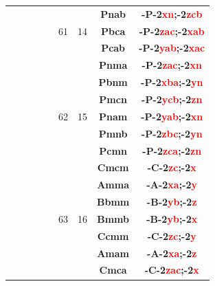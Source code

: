 \documentclass{article}      %
\begin{document}
\begin{small}
\begin{longtable}[c]{|c|c|c|c|c|c|c|c|c|}
          &  & & & &  & &\textbf{Pnab}         &\textbf{-P-2\textcolor{red}{xn};-2\textcolor{red}{zcb}}\\\cline{6-9}      
	  &  & & & &\textrm{61}  &\textrm{14} &\textbf{Pbca}         &\textbf{-P-2\textcolor{red}{zac};-2\textcolor{red}{xab}}\\\cline{8-9}     
          &  & & & &  & &\textbf{Pcab}         &\textbf{-P-2\textcolor{red}{yab};-2\textcolor{red}{xac}}\\\cline{6-9}     
          &  & & & &  & &\textbf{Pnma}         &\textbf{-P-2\textcolor{red}{zac};-2\textcolor{red}{xn}}\\\cline{8-9}      
          &  & & & &  & &\textbf{Pbnm}         &\textbf{-P-2\textcolor{red}{xba};-2\textcolor{red}{yn}}\\\cline{8-9}      
          &  & & & &  & &\textbf{Pmcn}         &\textbf{-P-2\textcolor{red}{ycb};-2\textcolor{red}{zn}}\\\cline{8-9}      
	  &  & & & &\textrm{62}  &\textrm{15} &\textbf{Pnam}         &\textbf{-P-2\textcolor{red}{yab};-2\textcolor{red}{xn}}\\\cline{8-9}      
          &  & & & &  & &\textbf{Pmnb}         &\textbf{-P-2\textcolor{red}{zbc};-2\textcolor{red}{yn}}\\\cline{8-9}      
          &  & & & &  & &\textbf{Pcmn}         &\textbf{-P-2\textcolor{red}{zca};-2\textcolor{red}{zn}}\\\cline{6-9}      
          &  & & & &  & &\textbf{Cmcm}         &\textbf{-C-2\textcolor{red}{zc};-2\textcolor{red}{x}}\\\cline{8-9}        
          &  & & & &  & &\textbf{Amma}         &\textbf{-A-2\textcolor{red}{xa};-2\textcolor{red}{y}}\\\cline{8-9}        
          &  & & & &  & &\textbf{Bbmm}         &\textbf{-B-2\textcolor{red}{yb};-2\textcolor{red}{z}}\\\cline{8-9}        
	  &  & & & &\textrm{63}  &\textrm{16} &\textbf{Bmmb}         &\textbf{-B-2\textcolor{red}{yb};-2\textcolor{red}{x}}\\\cline{8-9}        
          &  & & & &  & &\textbf{Ccmm}         &\textbf{-C-2\textcolor{red}{zc};-2\textcolor{red}{y}}\\\cline{8-9}        
          &  & & & &  & &\textbf{Amam}         &\textbf{-A-2\textcolor{red}{xa};-2\textcolor{red}{z}}\\\cline{6-9}        
          &  & & & &  & &\textbf{Cmca}         &\textbf{-C-2\textcolor{red}{zac};-2\textcolor{red}{x}}\\\cline{8-9}       

\end{longtable}
\end{small}
\end{document}
